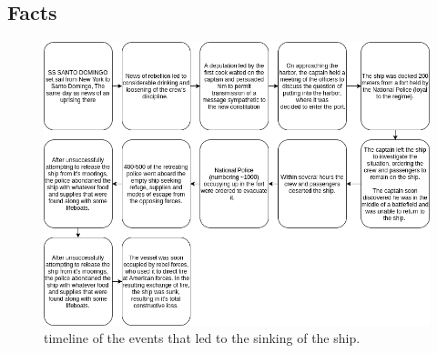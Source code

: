 
\subsection{Facts}

        

\begin{figure}[t]
  \centering
  \includegraphics[width=5in]{figures/story.png}
  \caption[Timeline of events]{\small timeline of the events that led to the sinking of the ship.}
  \label{fig:monitoring-test}
\end{figure}
    

